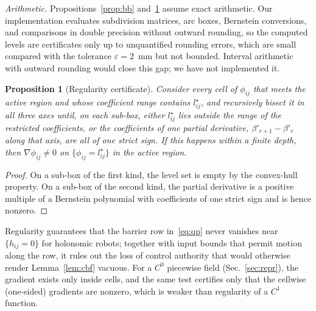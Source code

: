 \documentclass[journal]{IEEEtran}
\newtheorem{proposition}{Proposition}
\theoremstyle{definition}
\begin{document}
\emph{Arithmetic.} Propositions~\ref{prop:bb} and~\ref{prop:reg} assume exact arithmetic. Our
implementation evaluates subdivision matrices, arc boxes, Bernstein conversions, and comparisons in
double precision without outward rounding, so the computed levels are certificates only up to
unquantified rounding errors, which are small compared with the tolerance $\varepsilon=2$~mm but
not bounded. Interval arithmetic with outward rounding would close this gap; we have not
implemented it.

\begin{proposition}[Regularity certificate]\label{prop:reg}
Consider every cell of $\phi_{ij}$ that meets the active region and whose coefficient range contains
$l^\star_{ij}$, and recursively bisect it in all three axes until, on each sub-box, either
$l^\star_{ij}$ lies outside the range of the restricted coefficients, or the coefficients of one
partial derivative, $\beta'_{r+1}-\beta'_r$ along that axis, are all of one strict sign. If this
happens within a finite depth, then $\nabla\phi_{ij}\neq0$ on $\{\phi_{ij}=l^\star_{ij}\}$ in the
active region.
\end{proposition}
\begin{proof}
On a sub-box of the first kind, the level set is empty by the convex-hull property. On a sub-box of
the second kind, the partial derivative is a positive multiple of a Bernstein polynomial with
coefficients of one strict sign and is hence nonzero.
\end{proof}
Regularity guarantees that the barrier row in~\eqref{eq:qp} never vanishes near $\{h_{ij}=0\}$ for
holonomic robots; together with input bounds that permit motion along the row, it rules out the loss
of control authority that would otherwise render Lemma~\ref{lem:cbf} vacuous. For a $C^0$ piecewise
field (Sec.~\ref{sec:repr}), the gradient exists only inside cells, and the same test certifies only
that the cellwise (one-sided) gradients are nonzero, which is weaker than regularity of a $C^1$
function.

\end{document}
